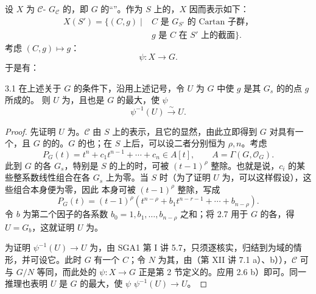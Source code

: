 设 $X$ 为 $\mathscr C$- $G_{\mathscr C}$ 的，即 $G$ 的“”。作为 $S$ 上的，$X$ 因而表示如下：
\[\begin{aligned}
X(S')=\{(C,g)\mid{}& C\text{ 是 }G_{S'}\text{ 的\ Cartan 子群，}\\
&g\text{ 是 }C\text{ 在 }S'\text{ 上的截面}\}.
\end{aligned}\]
考虑 $(C,g)\mapsto g$：
\[\psi:X\longrightarrow G.\]
于是有：
\begin{SGAresult}{}{3.1}
在上述关于 $G$ 的条件下，沿用上述记号，令 $U$ 为 $G$ 中使 $g$ 是其 $G_s$ 的的点 $g$ 所成的。
则 $U$ 为，且也是 $G$ 的最大，使 $\psi$ 
\[\psi^{-1}(U)\xrightarrow{\sim}U.\]
\end{SGAresult}
\begin{proof}
先证明 $U$ 为。$\mathscr C$ 由 $S$ 上的表示，且它的显然，由此立即得到 $G$ 对具有一个，且 $G$ 的的。$G$ 的也；在 $S$ 上后，可以设二者分别恒为 $\rho,n$。考虑 
\[P_G(t)=t^n+c_1t^{n-1}+\cdots+c_n\in A[t],\qquad A=\Gamma(G,\mathscr O_G).\]
此到 $G$ 的各 $G_s$，特别是 $S$ 的上的时，可被 $(t-1)^\rho$ 整除。也就是说，$c_i$ 的某些整系数线性组合在各 $G_s$ 上为零。当 $S$ 时（为了证明 $U$ 为，可以这样假设），这些组合本身便为零，因此 本身可被 $(t-1)^\rho$ 整除，写成
\[P_G(t)=(t-1)^\rho(t^{n-\rho}+b_1t^{n-r-1}+\cdots+b_{n-\rho}).\]
令 $b$ 为第二个因子的各系数 $b_0=1,b_1,\ldots,b_{n-\rho}$ 之和；将 2.7 用于 $G$ 的各，得 $U=G_b$，这就证明 $U$ 为。

为证明 $\psi^{-1}(U)\to U$ 为，由 SGA1 第 I 讲 5.7，只须逐核实，归结到为域的情形，并可设它。此时 $G$ 有一个 $C$；令 $N$ 为其，由（第 XII 讲 7.1 a）、b）），$\mathscr C$ 可与 $G/N$ 等同，而此处的 $\psi:X\to G$ 正是第 2 节定义的。应用 2.6 b）即可。同一推理也表明 $U$ 是 $G$ 的最大，使 $\psi$  $\psi^{-1}(U)\to U$。
\end{proof}
